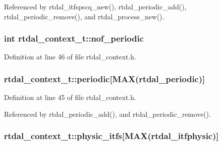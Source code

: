 Referenced by rtdal\-\_\-itfspscq\-\_\-new(), rtdal\-\_\-periodic\-\_\-add(), rtdal\-\_\-periodic\-\_\-remove(), and rtdal\-\_\-process\-\_\-new().

\hypertarget{structrtdal__context__t_a25c299df028c7b7b256ecd36b10b0c74}{
\subsubsection[{nof\-\_\-periodic}]{\setlength{\rightskip}{0pt plus 5cm}int rtdal\-\_\-context\-\_\-t\-::nof\-\_\-periodic}}\label{structrtdal__context__t_a25c299df028c7b7b256ecd36b10b0c74}


Definition at line 46 of file rtdal\-\_\-context.\-h.

\hypertarget{structrtdal__context__t_afdf9752c171c9dca028d37a8e92e02bc}{
\subsubsection[{periodic}]{ rtdal\-\_\-context\-\_\-t\-::periodic\mbox{[}{\bf M\-A\-X}(rtdal\-\_\-periodic)\mbox{]}}}\label{structrtdal__context__t_afdf9752c171c9dca028d37a8e92e02bc}


Definition at line 45 of file rtdal\-\_\-context.\-h.



Referenced by rtdal\-\_\-periodic\-\_\-add(), and rtdal\-\_\-periodic\-\_\-remove().

\hypertarget{structrtdal__context__t_a98f27c3f5224b9558e25106b4b0822e2}{
\subsubsection[{physic\-\_\-itfs}]{ rtdal\-\_\-context\-\_\-t\-::physic\-\_\-itfs\mbox{[}{\bf M\-A\-X}(rtdal\-\_\-itfphysic)\mbox{]}}}\label{structrtdal__context__t_a98f27c3f5224b9558e25106b4b0822e2}


